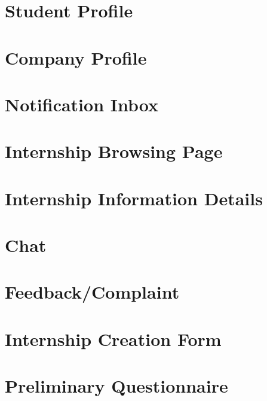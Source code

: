 \section{Student Profile}
\section{Company Profile}
\section{Notification Inbox}
\section{Internship Browsing Page}
\section{Internship Information Details}
\section{Chat}
\section{Feedback/Complaint}
\section{Internship Creation Form}
\section{Preliminary Questionnaire}




